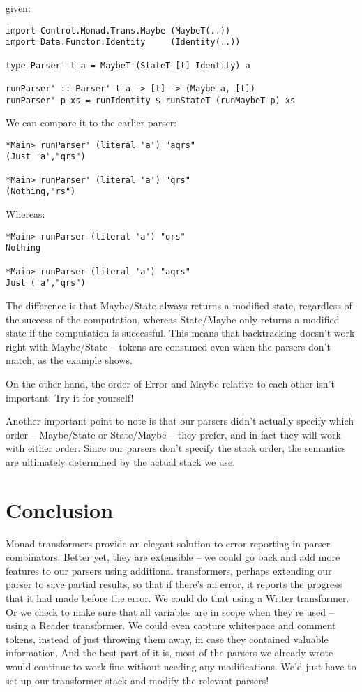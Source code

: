 \documentclass{tmr}
\begin{document}
given:
\begin{verbatim}
import Control.Monad.Trans.Maybe (MaybeT(..))
import Data.Functor.Identity     (Identity(..))

type Parser' t a = MaybeT (StateT [t] Identity) a

runParser' :: Parser' t a -> [t] -> (Maybe a, [t])
runParser' p xs = runIdentity $ runStateT (runMaybeT p) xs
\end{verbatim}
We can compare it to the earlier parser:
\begin{verbatim}
*Main> runParser' (literal 'a') "aqrs"
(Just 'a',"qrs")

*Main> runParser' (literal 'a') "qrs"
(Nothing,"rs")
\end{verbatim}
Whereas:
\begin{verbatim}
*Main> runParser (literal 'a') "qrs"
Nothing

*Main> runParser (literal 'a') "aqrs"
Just ('a',"qrs")
\end{verbatim}
The difference is that Maybe/State always returns a modified state, regardless
of the success of the computation, whereas State/Maybe only returns a modified
state if the computation is successful.  This means that backtracking doesn't
work right with Maybe/State -- tokens are consumed even when the parsers
don't match, as the example shows.

On the other hand, the order of Error and Maybe relative to each other isn't 
important.  Try it for yourself!

Another important point to note is that our parsers didn't actually specify
which order -- Maybe/State or State/Maybe -- they prefer, and in fact they will 
work with either order.  Since our parsers don't specify the stack order, the 
semantics are ultimately determined by the actual stack we use.




\section{Conclusion}
Monad transformers provide an elegant solution to error reporting in parser
combinators.  Better yet, they are extensible -- we could go back and add more
features to our parsers using additional transformers, perhaps extending our
parser to save partial results, so that if there's an error, it reports the
progress that it had made before the error.  We could do that using a Writer
transformer.  Or we check to make sure that all variables are in scope when
they're used -- using a Reader transformer.  We could even capture whitespace
and comment tokens, instead of just throwing them away, in case they contained
valuable information.  And the best part of it is, most of the parsers we already
wrote would continue to work fine without needing any modifications.  We'd just
have to set up our transformer stack and modify the relevant parsers! 





\end{document}
